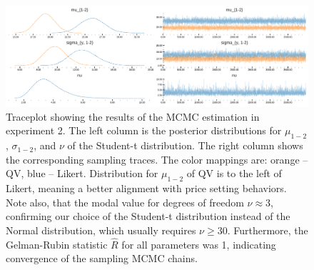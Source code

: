 \begin{figure}
  \centering
  \includegraphics[trim= 0in 0in 0in 0in, clip, width=\textwidth, keepaspectratio=true]{content/image/StudentTIndep_traceplot.pdf}
  \caption{
    Traceplot showing the results of the MCMC estimation in experiment 2. The left column is the posterior distributions for $\mu_{1-2}$, $\sigma_{1-2}$, and $\nu$ of the Student-t distribution. The right column shows the corresponding sampling traces. The color mappings are: orange -- QV, blue -- Likert. Distribution for $\mu_{1-2}$ of QV is to the left of Likert, meaning a better alignment with price setting behaviors. Note also, that the modal value for degrees of freedom $\nu \approx 3$, confirming our choice of the Student-t distribution instead of the Normal distribution, which usually requires $\nu \geq 30$. Furthermore, the Gelman-Rubin statistic $\hat{R}$ for all parameters was 1, indicating  convergence of the sampling MCMC chains.
  }
  \label{fig:traceplot_exp2}
\end{figure}